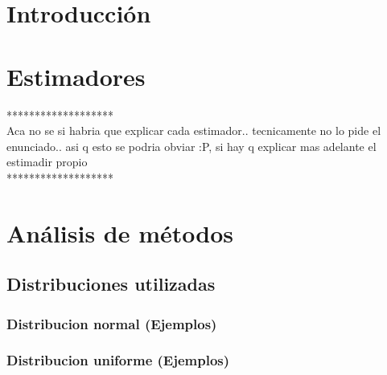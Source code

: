 \documentclass[10pt, a4paper]{article}
\author{Base de Datos, DC, UBA.}
\date{}
\title{}
\begin{document}
\thispagestyle{empty}
\titulo{}
\maketitle

\tableofcontents

\NoCaptionOfAlgo
\DontPrintSemicolon
\SetAlFnt{\ttfamily}

\newpage

\section{Introducci\'on}

	

\section{Estimadores }

*******************\\
Aca no se si habria que explicar cada estimador.. tecnicamente no lo pide el enunciado.. asi q esto se podria obviar :P, si hay q explicar mas adelante el estimadir propio\\
*******************

\section{An\'alisis de m\'etodos}

	\subsection{Distribuciones utilizadas}
	
		\subsubsection{Distribucion normal (Ejemplos)}	
		
					
		
		\subsubsection{Distribucion uniforme (Ejemplos)}	
		
\end{document}
